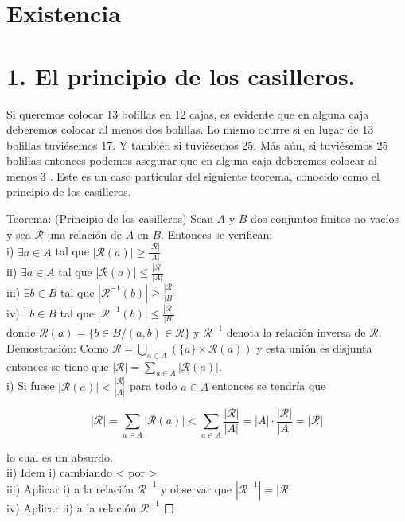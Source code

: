 \documentclass[10pt]{article}
\begin{document}
\section*{Existencia}
\section*{1. El principio de los casilleros.}
Si queremos colocar 13 bolillas en 12 cajas, es evidente que en alguna caja deberemos colocar al menos dos bolillas. Lo mismo ocurre si en lugar de 13 bolillas tuviésemos 17. Y también si tuviésemos 25. Más aún, si tuviésemos 25 bolillas entonces podemos asegurar que en alguna caja deberemos colocar al menos 3 . Este es un caso particular del siguiente teorema, conocido como el principio de los casilleros.

Teorema: (Principio de los casilleros) Sean $A$ y $B$ dos conjuntos finitos no vacíos y sea $\mathcal{R}$ una relación de $A$ en $B$. Entonces se verifican:\\
i) $\exists a \in A$ tal que $|\mathcal{R}(a)| \geq \frac{|\mathcal{R}|}{|A|}$\\
ii) $\exists a \in A$ tal que $|\mathcal{R}(a)| \leq \frac{|\mathcal{R}|}{|A|}$\\
iii) $\exists b \in B$ tal que $\left|\mathcal{R}^{-1}(b)\right| \geq \frac{|\mathcal{R}|}{|B|}$\\
iv) $\exists b \in B$ tal que $\left|\mathcal{R}^{-1}(b)\right| \leq \frac{|\mathcal{R}|}{|B|}$\\
donde $\mathcal{R}(a)=\{b \in B /(a, b) \in \mathcal{R}\}$ y $\mathcal{R}^{-1}$ denota la relación inversa de $\mathcal{R}$.\\
Demostración: Como $\mathcal{R}=\bigcup_{a \in A}(\{a\} \times \mathcal{R}(a))$ y esta unión es disjunta entonces se tiene que $|\mathcal{R}|=\sum_{a \in A}|\mathcal{R}(a)|$.\\
i) Si fuese $|\mathcal{R}(a)|<\frac{|\mathcal{R}|}{|A|}$ para todo $a \in A$ entonces se tendría que

$$
|\mathcal{R}|=\sum_{a \in A}|\mathcal{R}(a)|<\sum_{a \in A} \frac{|\mathcal{R}|}{|A|}=|A| \cdot \frac{|\mathcal{R}|}{|A|}=|\mathcal{R}|
$$

lo cual es un absurdo.\\
ii) Idem i) cambiando < por >\\
iii) Aplicar i) a la relación $\mathcal{R}^{-1}$ y observar que $\left|\mathcal{R}^{-1}\right|=|\mathcal{R}|$\\
iv) Aplicar ii) a la relación $\mathcal{R}^{-1}$ 口
\end{document}

